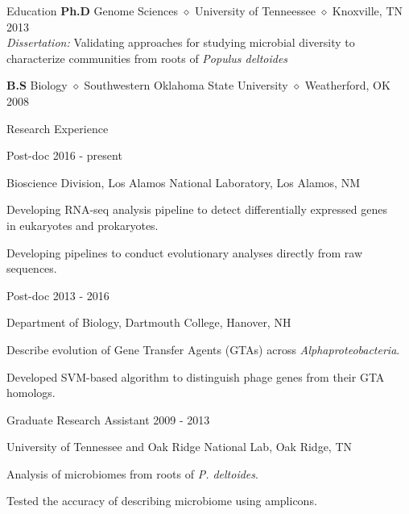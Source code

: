 \documentclass{resume} %
\begin{document}

\begin{rSection}{Education}
{\bf Ph.D} Genome Sciences {$\diamond$} University of Tenneessee {$\diamond$} Knoxville, TN \hfill {2013} \\
\textit{Dissertation:} Validating approaches for studying microbial diversity to \\
characterize communities from roots of \textit{Populus deltoides}


{\bf B.S}  Biology {$\diamond$} Southwestern Oklahoma State University {$\diamond$}  Weatherford, OK \hfill{2008}
\end{rSection}

\begin{rSection}{Research Experience}
\begin{rSubsection}{Post-doc} {2016 - present}{}{}
\item Bioscience Division, Los Alamos National Laboratory, Los Alamos, NM
\item Developing RNA-seq analysis pipeline to detect differentially expressed genes \\
in eukaryotes and prokaryotes.
\item Developing pipelines to conduct evolutionary analyses directly from raw sequences.
\end{rSubsection}

\begin{rSubsection}{Post-doc} {2013 - 2016}{}{}
\item Department of Biology, Dartmouth College, Hanover, NH
\item Describe evolution of Gene Transfer Agents (GTAs) across \textit{Alphaproteobacteria}.
\item Developed SVM-based algorithm to distinguish phage genes from their GTA homologs.
\end{rSubsection}

\begin{rSubsection}{Graduate Research Assistant} {2009 - 2013}{}{}
\item University of Tennessee and Oak Ridge National Lab, Oak Ridge, TN 
\item Analysis of microbiomes from roots of \textit{P. deltoides}.
\item Tested the accuracy of describing microbiome using amplicons.
\end{rSubsection}
\end{rSection}
\end{document}
